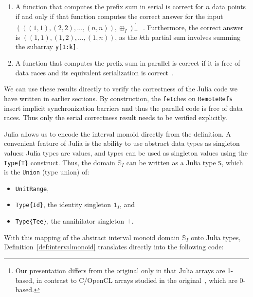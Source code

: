 \documentclass{sig-alternate}
\newcommand{\code}[1]{\texttt{#1}}
\begin{document}
\begin{enumerate}
		
\item 	A function that computes the prefix sum in serial is correct for $n$
	data points if and only if that function computes the correct answer
	for the input \\
	$\left(\left((1, 1), (2, 2), \dots, (n, n)\right),
	\oplus_I\right)$\footnote{Our presentation differs from the original
	only in that Julia arrays are 1-based, in contrast to C/OpenCL arrays
	studied in the original~\cite{Chong2014}, which are 0-based.}
	~\cite[Theorem 4.5]{Chong2014}.
	Furthermore, the correct answer is $\left((1, 1), (1, 2), \dots, (1, n)
	\right)$, as the $k$th partial sum involves summing the subarray
	\code{y[1:k]}.
	
\item	A function that computes the prefix sum in parallel is correct if it is
	free of data races and its equivalent serialization is
	correct~\cite[Theorem 5.3]{Chong2014}.

\end{enumerate}

We can use these results directly to verify the correctness of the Julia code
we have written in earlier sections. By construction, the \code{fetch}es on
\code{RemoteRefs} insert implicit synchronization barriers and thus the
parallel code is free of data races. Thus only the serial correctness result
needs to be verified explicitly.

Julia allows us to encode the interval monoid directly from the definition. A
convenient feature of Julia is the ability to use abstract data types as
singleton values: Julia types are values, and types can be used as singleton
values using the \code{Type\{T\}} construct. Thus, the domain $\mathbb S_I$ can
be written as a Julia type \code{S}, which is the \code{Union} (type union) of:

\begin{itemize}
	\item \code{UnitRange},
	\item \code{Type\{Id\}}, the identity singleton $\mathbf 1_I$, and
	\item \code{Type\{Tee\}}, the annihilator singleton $\top$.
\end{itemize}

With this mapping of the abstract interval monoid domain $\mathbb S_I$ onto
Julia types, Definition~\ref{def:intervalmonoid} translates directly into the
following code:
\end{document}
